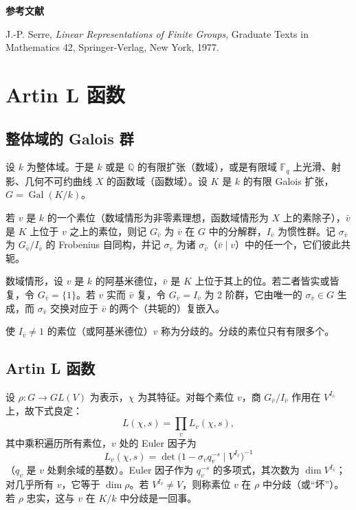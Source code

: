 {\small
\par\medskip\noindent\textbf{参考文献}\par\nopagebreak
\noindent[1] J.-P. Serre, \emph{Linear Representations of Finite Groups}, Graduate Texts in Mathematics 42, Springer-Verlag, New York, 1977.\par
}

\section{Artin L 函数}\label{c4:sec:3}

\subsection{整体域的 Galois 群}\label{c4:sec:3.1}

设 $k$ 为整体域。于是 $k$ 或是 $\mathbb{Q}$ 的有限扩张（数域），或是有限域 $\mathbb{F}_q$ 上光滑、射影、几何不可约曲线 $X$ 的函数域（函数域）。设 $K$ 是 $k$ 的有限 Galois 扩张，$G=\operatorname{Gal}(K/k)$。

若 $v$ 是 $k$ 的一个素位（数域情形为非零素理想，函数域情形为 $X$ 上的素除子），$\bar v$ 是 $K$ 上位于 $v$ 之上的素位，则记 $G_{\bar v}$ 为 $\bar v$ 在 $G$ 中的分解群，$I_{\bar v}$ 为惯性群。记 $\sigma_{\bar v}$ 为 $G_{\bar v}/I_{\bar v}$ 的 Frobenius 自同构，并记 $\sigma_v$ 为诸 $\sigma_{\bar v}$（$\bar v\mid v$）中的任一个，它们彼此共轭。

数域情形，设 $v$ 是 $k$ 的阿基米德位，$\bar v$ 是 $K$ 上位于其上的位。若二者皆实或皆复，令 $G_{\bar v}=\{1\}$。若 $v$ 实而 $\bar v$ 复，令 $G_{\bar v}=I_{\bar v}$ 为 2 阶群，它由唯一的 $\sigma_{\bar v}\in G$ 生成，而 $\sigma_{\bar v}$ 交换对应于 $\bar v$ 的两个（共轭的）复嵌入。

使 $I_{\bar v}\neq1$ 的素位（或阿基米德位）$v$ 称为分歧的。分歧的素位只有有限多个。

\subsection{Artin L 函数}\label{c4:sec:3.2}

设 $\rho\colon G\to GL(V)$ 为表示，$\chi$ 为其特征。对每个素位 $v$，商 $G_{\bar v}/I_{\bar v}$ 作用在 $V^{I_{\bar v}}$ 上，故下式良定：
\begin{equation}\tag{3.1}\label{c4:eq:3.1}
L(\chi,s)=\prod_{v}L_v(\chi,s),
\end{equation}
其中乘积遍历所有素位，$v$ 处的 Euler 因子为
\begin{equation}\tag{3.2}\label{c4:eq:3.2}
L_v(\chi,s)=\det\bigl(1-\sigma_vq_v^{-s}\mid V^{I_{\bar v}}\bigr)^{-1}
\end{equation}
（$q_v$ 是 $v$ 处剩余域的基数）。Euler 因子作为 $q_v^{-s}$ 的多项式，其次数为 $\dim V^{I_{\bar v}}$；对几乎所有 $v$，它等于 $\dim\rho$。若 $V^{I_{\bar v}}\neq V$，则称素位 $v$ 在 $\rho$ 中分歧（或“坏”）。若 $\rho$ 忠实，这与 $v$ 在 $K/k$ 中分歧是一回事。

